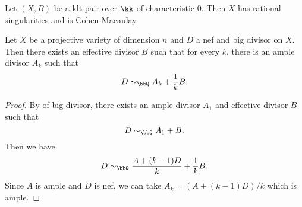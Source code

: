     \begin{lemma}\label{lem: klt pair has rational singularities and is Cohen-Macaulay}
        Let \((X,B)\) be a klt pair over \(\kk\) of characteristic \(0\).
        Then \(X\) has rational singularities and is Cohen-Macaulay.
    \end{lemma}

    \begin{lemma}\label{lem:nef_and_big_approximation_by_ample}
        Let \(X\) be a projective variety of dimension \(n\) and \(D\) a nef and big divisor on \(X\).
        Then there exists an effective divisor \(B\) such that for every \(k\), there is an ample divisor \(A_k\) such that 
        \[ D \sim_\bbQ A_k + \frac{1}{k}B. \]
    \end{lemma}
    \begin{proof}
        By  of big divisor, there exists an ample divisor \(A_1\) and effective divisor \(B\) such that
        \[ D \sim_\bbQ A_1 + B. \]
        Then we have 
        \[ D \sim_\bbQ \frac{A + (k-1)D}{k} + \frac{1}{k}B. \]
        Since \(A\) is ample and \(D\) is nef, we can take \(A_k = (A + (k-1)D)/k\) which is ample.
    \end{proof}
 
    

